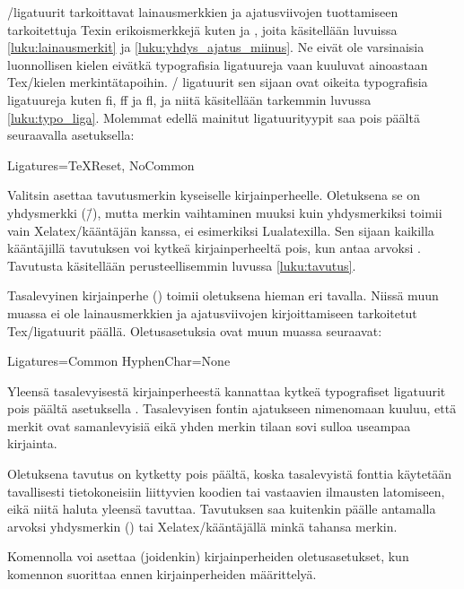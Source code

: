 \-/ligatuurit tarkoittavat lainausmerkkien ja ajatusviivojen
tuottamiseen tarkoitettuja Texin erikoismerkkejä kuten  ja
\koodi{\==}, joita käsitellään luvuissa \ref{luku:lainausmerkit} ja
\ref{luku:yhdys_ajatus_miinus}. Ne eivät ole varsinaisia luonnollisen
kielen eivätkä typografisia ligatuureja vaan kuuluvat ainoastaan
Tex\-/kielen merkintätapoihin. \-/ ligatuurit sen sijaan
ovat oikeita typografisia ligatuureja kuten fi, ff ja fl, ja niitä
käsitellään tarkemmin luvussa \ref{luku:typo_liga}. Molemmat edellä
mainitut ligatuurityypit saa pois päältä seuraavalla asetuksella:

\begin{koodilohkosis}
Ligatures={TeXReset, NoCommon}
\end{koodilohkosis}

Valitsin  asettaa tavutusmerkin kyseiselle
kirjainperheelle. Oletuksena se on yhdysmerkki (\=/), mutta merkin
vaihtaminen muuksi kuin yhdysmerkiksi toimii vain Xelatex\-/kääntäjän
kanssa, ei esimerkiksi Lualatexilla. Sen sijaan kaikilla kääntäjillä
tavutuksen voi kytkeä kirjainperheeltä pois, kun antaa arvoksi
. Tavutusta käsitellään perusteellisemmin luvussa
\ref{luku:tavutus}.

Tasalevyinen kirjainperhe () toimii oletuksena
hieman eri tavalla. Niissä muun muassa ei ole lainausmerkkien ja
ajatusviivojen kirjoittamiseen tarkoitetut Tex\-/ligatuurit päällä.
Oletusasetuksia ovat muun muassa seuraavat:

\begin{koodilohkosis}
Ligatures=Common
HyphenChar=None
\end{koodilohkosis}

Yleensä tasalevyisestä kirjainperheestä kannattaa kytkeä typografiset
ligatuurit pois päältä asetuksella .
Tasalevyisen fontin ajatukseen nimenomaan kuuluu, että merkit ovat
samanlevyisiä eikä yhden merkin tilaan sovi sulloa useampaa kirjainta.

Oletuksena tavutus on kytketty pois päältä, koska tasalevyistä fonttia
käytetään tavallisesti tietokoneisiin liittyvien koodien tai vastaavien
ilmausten latomiseen, eikä niitä haluta yleensä tavuttaa. Tavutuksen saa
kuitenkin päälle antamalla arvoksi yhdysmerkin
() tai Xelatex\-/kääntäjällä minkä
tahansa merkin.

Komennolla  voi asettaa (joidenkin)
kirjainperheiden oletusasetukset, kun komennon suorittaa ennen
kirjainperheiden määrittelyä.

